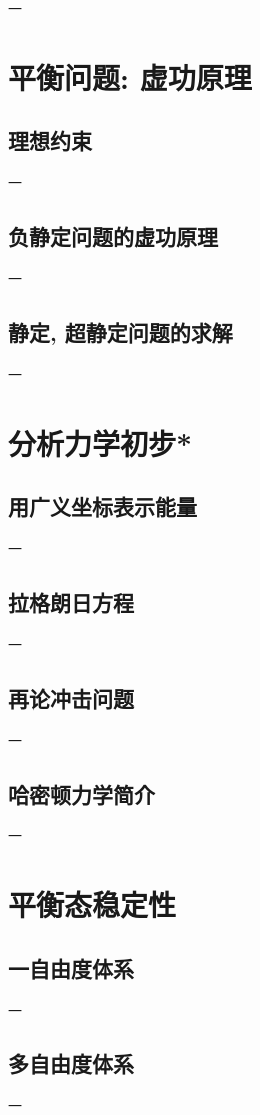 一

\section{平衡问题:  虚功原理}

\subsection{理想约束}

一

\subsection{负静定问题的虚功原理}

一

\subsection{静定,  超静定问题的求解}

一

\section{分析力学初步*}

\subsection{用广义坐标表示能量}

一

\subsection{拉格朗日方程}

一

\subsection{再论冲击问题}

一

\subsection{哈密顿力学简介}

一

\section{平衡态稳定性}

\subsection{一自由度体系}

一

\subsection{多自由度体系}

一
